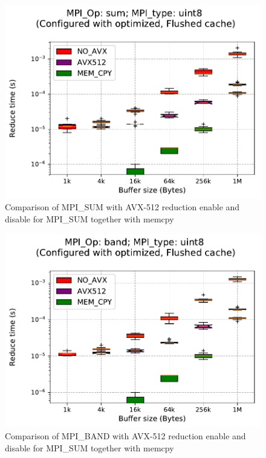 \documentclass[sigconf]{acmart}
\begin{document}
\begin{figure}[h]
    \centering
    \includegraphics[trim={0 0 0 1.5cm},clip, width=\linewidth]{avx_sum.pdf}
    \caption{Comparison of MPI\_SUM with AVX-512 reduction enable and disable for MPI\_SUM together with memcpy}
    \label{fig:avx_sum}
\end{figure}

\begin{figure}[h]
    \centering
    \includegraphics[trim={0 0 0 1.5cm},clip,width=\linewidth]{avx_band.pdf}
    \caption{Comparison of MPI\_BAND with AVX-512 reduction enable and disable for MPI\_SUM together with memcpy}
    \label{fig:avx_band}
\end{figure}
\end{document}
